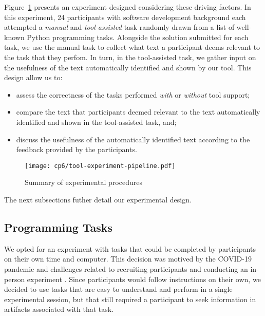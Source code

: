 Figure~\ref{fig:tool-experiment-procedures} presents an experiment designed considering these driving factors. In this experiment, 24 participants with software development background each attempted a
\textit{manual} and \textit{tool-assisted} task randomly drawn from a list of well-known Python programming tasks.
Alongside the solution submitted for each task, we use the manual task to collect what text a participant deems relevant to the task that they perfom.
In turn, in the tool-assisted task, we gather input on the usefulness of the text automatically identified and shown by our tool. 
This design allow us to:




\begin{itemize}
    \item assess the correctness of the tasks performed \textit{with} or \textit{without} tool support;
    \item compare  the text that participants deemed relevant to the text automatically identified
    and shown in the tool-assisted task, and;
    \item discuss the usefulness of the automatically identified text according to the feedback provided by the participants.
\end{itemize}
 





\begin{figure}
\centering
\texttt{[image: cp6/tool-experiment-pipeline.pdf]}
\caption{Summary of experimental procedures}
\label{fig:tool-experiment-procedures}
\end{figure}


The next subsections futher detail our experimental design.



\subsection{Programming Tasks}
\label{cp6:tasks}


We opted for an experiment with tasks that could be completed by participants on their own time and computer.
This decision was motived by the COVID-19 pandemic and challenges related to recruiting participants and conducting an in-person experiment \red{~\cite{}}. 
Since participants would follow instructions on their own, we decided to use tasks that are easy to understand and perform in a single experimental session, but that still required a participant  
to seek information in artifacts associated with that task.



